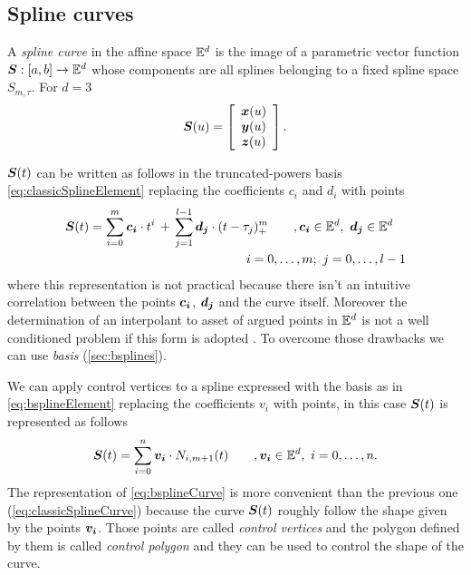 \documentclass[dissertation.tex]{subfiles}
\begin{document}
\subsection{Spline curves}
A \emph{spline curve} in the affine space $\mathbb{E}^d$ is the image of a
parametric vector function $\boldsymbol{S}:[a,b]\rightarrow\mathbb{E}^d$ whose
components are all splines belonging to a fixed spline space
$S_{m,\tau}$. For $d=3$
\begin{equation}\label{eq:bsplineCurveComp}
  \boldsymbol{S}(u) = \left[
    \begin{array}{c}
      \boldsymbol{x}(u)\\
      \boldsymbol{y}(u)\\
      \boldsymbol{z}(u)
    \end{array}
    \right].
\end{equation}

$\boldsymbol{S}(t)$ can be written as follows in the
truncated-powers basis
\cref{eq:classicSplineElement} replacing the coefficients $c_i$ and
$d_i$ with points
\begin{equation}\label{eq:classicSplineCurve}
  \begin{multlined}
  \ve{S}(t)=\sum_{i=0}^m \ve{c_i}\cdot t^i\, +\, \sum_{j=1}^{l-1}
  \ve{d_j}\cdot (t-\tau_j)_+^m\qquad,\ve{c_i}\in\mE^d,\
  \ve{d_j}\in\mE^d\\
  i=0,\dots,m;\ j=0,\dots,l-1
  \end{multlined}
\end{equation}
where this representation is not practical because
there isn't an intuitive correlation between the points
$\boldsymbol{c_i}$, $\boldsymbol{d_j}$ and the curve itself. Moreover the
determination of an interpolant to asset of argued points in $\mathbb{E}^d$
is not a well conditioned problem if this form is adopted
\cite{deboor}. To overcome those drawbacks we can use \emph{\bss
  basis} (\cref{sec:bsplines}).

We can apply control vertices to a spline expressed with the \bs
basis as in \cref{eq:bsplineElement} replacing the coefficients $v_i$
with points, in this case $\boldsymbol{S}(t)$ is represented as follows
\begin{equation}\label{eq:bsplineCurve}
  \boldsymbol{S}(t)=\sum_{i=0}^n\boldsymbol{v_i}\cdot N_{i,m+1}(t)\qquad
  ,\boldsymbol{v_i}\in\mathbb{E}^d,\ i=0,\dots,n.
\end{equation}
The representation of \cref{eq:bsplineCurve} is more convenient
than the previous one (\cref{eq:classicSplineCurve}) because the curve
$\boldsymbol{S}(t)$ roughly 
follow the shape given by the points $\boldsymbol{v_i}$. Those points are
called \emph{control vertices} and the polygon defined by them is
called \emph{control polygon} and they can be used to control the
shape of the curve.
\end{document}

